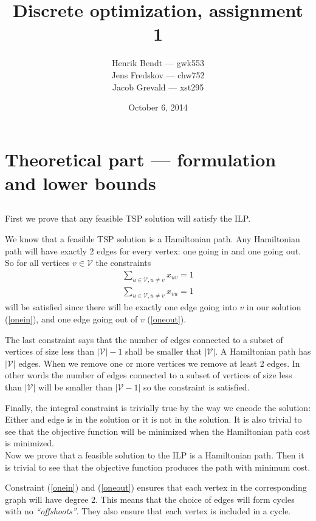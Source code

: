 \documentclass[11pt]{article}
\title{Discrete optimization, assignment 1}
\author{
    Henrik Bendt --- gwk553 \\
    Jens Fredskov --- chw752 \\
    Jacob Grevald --- xst295
}
\date{October 6, 2014}
\begin{document}
\maketitle

\section*{Theoretical part --- formulation and lower bounds}

\subsection{}
First we prove that any feasible TSP solution will satisfy the ILP\@.

We know that a feasible TSP solution is a Hamiltonian path. Any Hamiltonian path
will have exactly 2 edges for every vertex: one going in and one going out. So
for all vertices $v \in \mathcal{V}$ the constraints 
\begin{align}
    \sum_{u\in\mathcal{V},u\neq v} x_{uv} = 1 \label{onein}\\
    \sum_{u\in\mathcal{V},u\neq v} x_{vu} = 1 \label{oneout}
\end{align}
will be satisfied since there will be exactly one edge going into $v$
in our solution (\ref{onein}), and one edge going out of $v$ (\ref{oneout}).

The last constraint says that the number of edges connected to a subset of
vertices of size less than $|\mathcal{V}|-1$ shall be smaller that
$|\mathcal{V}|$. A Hamiltonian path has $|\mathcal{V}|$ edges. When we remove
one or more vertices we remove at least 2 edges. In other words the number of
edges connected to a subset of vertices of size less than $|\mathcal{V}|$ will
be smaller than $|\mathcal{V}-1|$ so the constraint is satisfied.

Finally, the integral constraint is trivially true by the way we encode the
solution: Either and edge is in the solution or it is not in the solution. It is
also trivial to see that the objective function will be minimized when the
Hamiltonian path cost is minimized. \\

Now we prove that a feasible solution to the ILP is a Hamiltonian path. Then it
is trivial to see that the objective function produces the path with minimum
cost.

Constraint (\ref{onein}) and (\ref{oneout}) ensures that each vertex in the
corresponding graph will have degree 2. This means that the choice of edges will
form cycles with no {\it``offshoots''}. They also ensure that each vertex is
included in a cycle.
\end{document}
